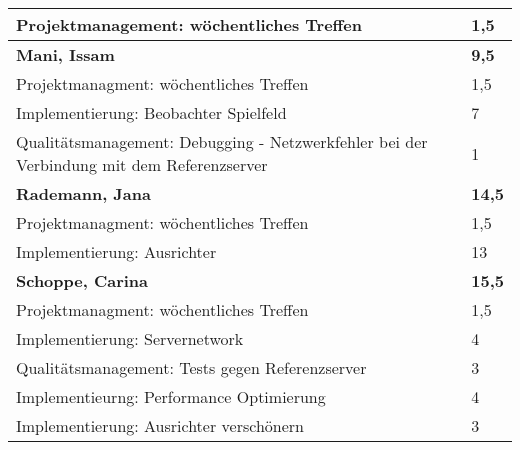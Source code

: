 \documentclass[a4paper,11pt]{scrartcl}
\begin{document}
\begin{longtable}{| p{13.8cm} | C{2.4cm} |}
	Projektmanagement: wöchentliches Treffen
	&
  1,5
	\\
	\hline
	\hline


	\textbf{Mani, Issam} & \textbf{9,5}\\ %
	\hline

  Projektmanagment: wöchentliches Treffen
	&
  1,5
	\\
	\hline

  Implementierung: Beobachter Spielfeld
	&
  7
	\\
	\hline

  Qualitätsmanagement: Debugging - Netzwerkfehler bei der Verbindung mit dem Referenzserver
	&
  1
	\\
	\hline
	\hline


	\textbf{Rademann, Jana} & \textbf{14,5}\\ %
	\hline

  Projektmanagment: wöchentliches Treffen
	&
  1,5
	\\
	\hline

  Implementierung: Ausrichter
	&
  13
	\\
	\hline
	\hline


	\textbf{Schoppe, Carina} & \textbf{15,5}\\ %
	\hline

  Projektmanagment: wöchentliches Treffen
	&
  1,5
	\\
	\hline

  Implementierung: Servernetwork
	&
  4
	\\
	\hline

  Qualitätsmanagement: Tests gegen Referenzserver
	&
  3
	\\
	\hline

  Implementieurng: Performance Optimierung
	&
  4
	\\
	\hline

  Implementierung: Ausrichter verschönern
	&
  3
	\\
	\hline
	\hline


\end{longtable}
\end{document}
